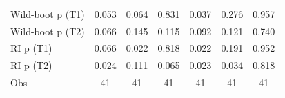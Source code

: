 {\begin{tabular}{l*{6}{c}}
Wild-boot p (T1)    &       0.053         &       0.064         &       0.831         &       0.037         &       0.276         &       0.957         \\
Wild-boot p (T2)    &       0.066         &       0.145         &       0.115         &       0.092         &       0.121         &       0.740         \\
RI p (T1)           &       0.066         &       0.022         &       0.818         &       0.022         &       0.191         &       0.952         \\
RI p (T2)           &       0.024         &       0.111         &       0.065         &       0.023         &       0.034         &       0.818         \\
Obs                 &          41         &          41         &          41         &          41         &          41         &          41         \\
\bottomrule
\end{tabular}
}
